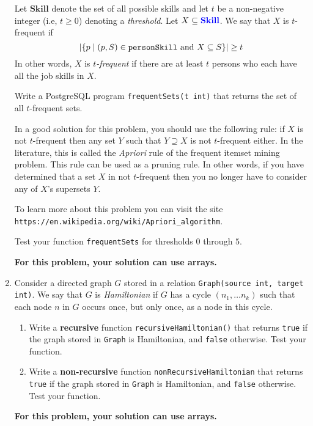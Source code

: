 \documentclass[10pt]{article}
\newcommand{\blue}[1]{{\color{blue}#1}}
\begin{document}
\begin{enumerate}[resume]
Let \blue{$\mathbf{Skill}$} denote the set of all possible skills and
let $t$ be a non-negative integer (i.e, $t\geq 0$) denoting a \emph{threshold}. 
Let $X \subseteq \blue{\mathbf{Skill}}$.   We say that $X$ is $t$-frequent if
\[|\{p\mid (p,S)\in {\tt personSkill}\ \text{and}\ X\subseteq S\}| \geq t\]
In other words, $X$ is \emph{$t$-frequent} if there are at least $t$ persons who each have all the job skills
in $X$.

Write a PostgreSQL program {\tt frequentSets(t int)} that returns the set of all $t$-frequent sets.

In a good solution for this problem, you should use the following rule:
if $X$ is not $t$-frequent then any set $Y$ such that $Y\supseteq X$ is not $t$-frequent either.
In the literature, this is called the \emph{Apriori} rule of the frequent itemset mining problem.
This rule can be used as a pruning rule.   In other words, if you have determined that a
set $X$ in not $t$-frequent then you no longer have to consider any of $X$'s supersets $Y$.

To learn more about this problem you can visit the site\\ {\tt https://en.wikipedia.org/wiki/Apriori\_algorithm}.

Test your function {\tt frequentSets} for thresholds $0$ through $5$.

\blue{\bf For this problem, your solution can use arrays.}


\item %

Consider a directed graph $G$ stored in a relation {\tt Graph(source int, target int)}.  We say that 
$G$ is \emph{Hamiltonian} if $G$ has a cycle $(n_1,\ldots n_k)$ such that each node $n$ in $G$ occurs once, but only once, as a node in this cycle.

\begin{enumerate}
\item Write a {\bf recursive} function {\tt recursiveHamiltonian()} that returns {\tt true} if the
graph stored in {\tt Graph} is Hamiltonian, and {\tt false} otherwise.   Test your function.
\item Write a {\bf non-recursive} function {\tt nonRecursiveHamiltonian}
that returns {\tt true} if the
graph stored in {\tt Graph} is Hamiltonian, and {\tt false} otherwise.   Test your function.
\end{enumerate}


\blue{\bf For this problem, your solution can use arrays.}


\end{enumerate}
\end{document}
